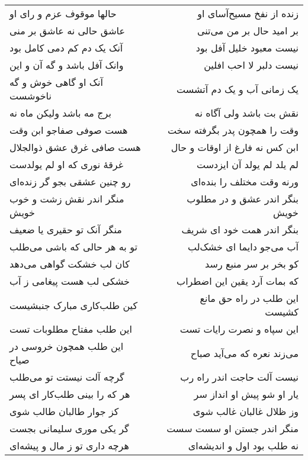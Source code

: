 \begin{center}
\begin{longtable}{l p{0.5cm} r}
\\
حالها موقوف عزم و رای او
&&
زنده از نفخ مسیح‌آسای او
\\
عاشق حالی نه عاشق بر منی
&&
بر امید حال بر من می‌تنی
\\
آنک یک دم کم دمی کامل بود
&&
نیست معبود خلیل آفل بود
\\
وانک آفل باشد و گه آن و این
&&
نیست دلبر لا احب افلین
\\
آنک او گاهی خوش و گه ناخوشست
&&
یک زمانی آب و یک دم آتشست
\\
برج مه باشد ولیکن ماه نه
&&
نقش بت باشد ولی آگاه نه
\\
هست صوفی صفاجو ابن وقت
&&
وقت را همچون پدر بگرفته سخت
\\
هست صافی غرق عشق ذوالجلال
&&
ابن کس نه فارغ از اوقات و حال
\\
غرقهٔ نوری که او لم یولدست
&&
لم یلد لم یولد آن ایزدست
\\
رو چنین عشقی بجو گر زنده‌ای
&&
ورنه وقت مختلف را بنده‌ای
\\
منگر اندر نقش زشت و خوب خویش
&&
بنگر اندر عشق و در مطلوب خویش
\\
منگر آنک تو حقیری یا ضعیف
&&
بنگر اندر همت خود ای شریف
\\
تو به هر حالی که باشی می‌طلب
&&
آب می‌جو دایما ای خشک‌لب
\\
کان لب خشکت گواهی می‌دهد
&&
کو بخر بر سر منبع رسد
\\
خشکی لب هست پیغامی ز آب
&&
که بمات آرد یقین این اضطراب
\\
کین طلب‌کاری مبارک جنبشیست
&&
این طلب در راه حق مانع کشیست
\\
این طلب مفتاح مطلوبات تست
&&
این سپاه و نصرت رایات تست
\\
این طلب همچون خروسی در صیاح
&&
می‌زند نعره که می‌آید صباح
\\
گرچه آلت نیستت تو می‌طلب
&&
نیست آلت حاجت اندر راه رب
\\
هر که را بینی طلب‌کار ای پسر
&&
یار او شو پیش او انداز سر
\\
کز جوار طالبان طالب شوی
&&
وز ظلال غالبان غالب شوی
\\
گر یکی موری سلیمانی بجست
&&
منگر اندر جستن او سست سست
\\
هرچه داری تو ز مال و پیشه‌ای
&&
نه طلب بود اول و اندیشه‌ای
\\
\end{longtable}
\end{center}
